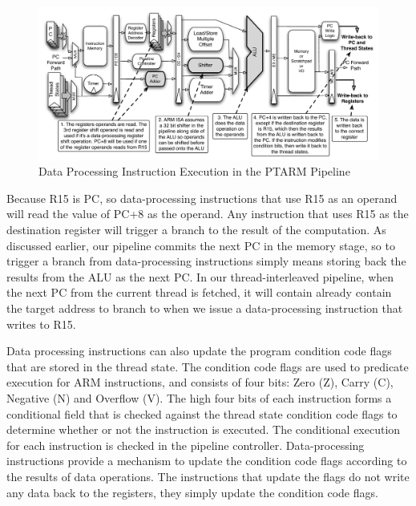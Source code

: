 \begin{figure}[h]
  \vspace{-15pt}
  \begin{center}
    \includegraphics[scale=.54]{figs/data_processing_pipeline_implementation}
  \end{center}
  \vspace{-3mm}
  \caption{Data Processing Instruction Execution in the PTARM Pipeline}
  \label{fig:data_processing_pipeline_implementation}
\end{figure}

Because R15 is PC, so data-processing instructions that use R15 as an operand will read the value of PC+8 as the operand. 
Any instruction that uses R15 as the destination register will trigger a branch to the result of the computation.
As discussed earlier, our pipeline commits the next PC in the memory stage, so to trigger a branch from data-processing instructions simply means storing back the results from the ALU as the next PC.
In our thread-interleaved pipeline, when the next PC from the current thread is fetched, it will contain already contain the target address to branch to when we issue a data-processing instruction that writes to R15. 

Data processing instructions can also update the program condition code flags that are stored in the thread state. 
The condition code flags are used to predicate execution for ARM instructions, and consists of four bits: Zero (Z), Carry (C), Negative (N) and Overflow (V). 
The high four bits of each instruction forms a conditional field that is checked against the thread state condition code flags to determine whether or not the instruction is executed. 
The conditional execution for each instruction is checked in the pipeline controller. 
Data-processing instructions provide a mechanism to update the condition code flags according to the results of data operations.
The instructions that update the flags do not write any data back to the registers, they simply update the condition code flags.

